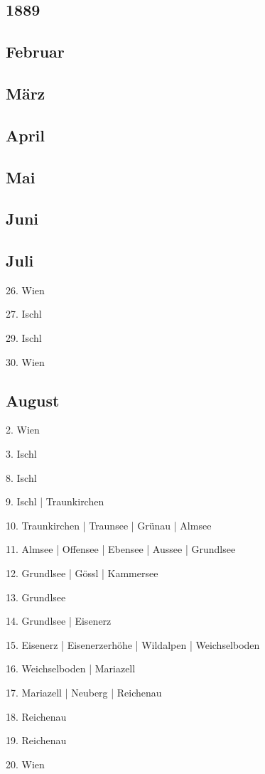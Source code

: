 \documentclass[twoside=false,titlepage=false,open=any, parskip=never, fontsize=10pt, headings=small, chapterprefix=false, appendixprefix=false, DIV=15]{scrbook}
\begin{document}
\begin{multicols}{3}
            \chapter*{1889}
            \section*{Februar}
            \section*{März}
            \section*{April}
            \section*{Mai}
            \section*{Juni}
            \section*{Juli}
            26. Wien\par
            27. Ischl\par
            29. Ischl\par
            30. Wien\par
            \section*{August}
            2. Wien\par
            3. Ischl\par
            8. Ischl\par
            9. Ischl | Traunkirchen\par
            10. Traunkirchen | Traunsee | Grünau | Almsee\par
            11. Almsee | Offensee | Ebensee | Aussee | Grundlsee\par
            12. Grundlsee | Gössl | Kammersee\par
            13. Grundlsee\par
            14. Grundlsee | Eisenerz\par
            15. Eisenerz | Eisenerzerhöhe | Wildalpen | Weichselboden\par
            16. Weichselboden | Mariazell\par
            17. Mariazell | Neuberg | Reichenau\par
            18. Reichenau\par
            19. Reichenau\par
            20. Wien\par

\end{multicols}
\end{document}
